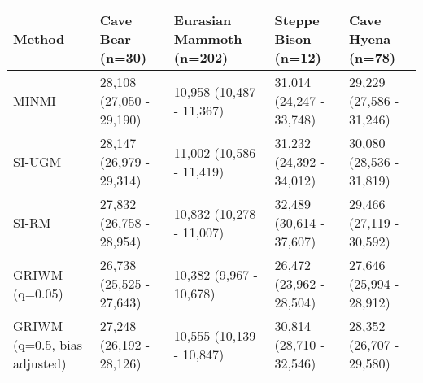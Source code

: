 
\begin{tabular}{lllll}
\toprule
Method & Cave Bear (n=30) & Eurasian Mammoth (n=202) & Steppe Bison (n=12) & Cave Hyena (n=78)\\
\midrule
MINMI & 28,108 (27,050 - 29,190) & 10,958 (10,487 - 11,367) & 31,014 (24,247 - 33,748) & 29,229 (27,586 - 31,246)\\
SI-UGM & 28,147 (26,979 - 29,314) & 11,002 (10,586 - 11,419) & 31,232 (24,392 - 34,012) & 30,080 (28,536 - 31,819)\\
SI-RM & 27,832 (26,758 - 28,954) & 10,832 (10,278 - 11,007) & 32,489 (30,614 - 37,607) & 29,466 (27,119 - 30,592)\\
GRIWM (q=0.05) & 26,738 (25,525 - 27,643) & 10,382 (9,967 - 10,678) & 26,472 (23,962 - 28,504) & 27,646 (25,994 - 28,912)\\
GRIWM (q=0.5, bias adjusted) & 27,248 (26,192 - 28,126) & 10,555 (10,139 - 10,847) & 30,814 (28,710 - 32,546) & 28,352 (26,707 - 29,580)\\
\bottomrule
\end{tabular}
